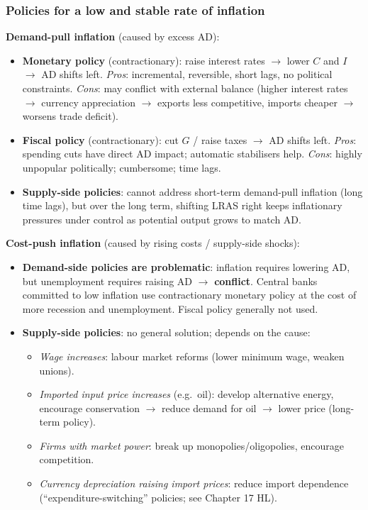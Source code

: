 \documentclass[a4paper,12pt]{article}
\begin{document}
\subsubsection*{Policies for a low and stable rate of inflation}
\textbf{Demand-pull inflation} (caused by excess AD):
\begin{itemize}
  \item \textbf{Monetary policy} (contractionary): raise interest rates $\to$ lower $C$ and $I$ $\to$ AD shifts left. \textit{Pros}: incremental, reversible, short lags, no political constraints. \textit{Cons}: may conflict with external balance (higher interest rates $\to$ currency appreciation $\to$ exports less competitive, imports cheaper $\to$ worsens trade deficit).
  \item \textbf{Fiscal policy} (contractionary): cut $G$ / raise taxes $\to$ AD shifts left. \textit{Pros}: spending cuts have direct AD impact; automatic stabilisers help. \textit{Cons}: highly unpopular politically; cumbersome; time lags.
  \item \textbf{Supply-side policies}: cannot address short-term demand-pull inflation (long time lags), but over the long term, shifting LRAS right keeps inflationary pressures under control as potential output grows to match AD.
\end{itemize}
\textbf{Cost-push inflation} (caused by rising costs / supply-side shocks):
\begin{itemize}
  \item \textbf{Demand-side policies are problematic}: inflation requires lowering AD, but unemployment requires raising AD $\to$ \textbf{conflict}. Central banks committed to low inflation use contractionary monetary policy at the cost of more recession and unemployment. Fiscal policy generally not used.
  \item \textbf{Supply-side policies}: no general solution; depends on the cause:
  \begin{itemize}
    \item \textit{Wage increases}: labour market reforms (lower minimum wage, weaken unions).
    \item \textit{Imported input price increases} (e.g.\ oil): develop alternative energy, encourage conservation $\to$ reduce demand for oil $\to$ lower price (long-term policy).
    \item \textit{Firms with market power}: break up monopolies/oligopolies, encourage competition.
    \item \textit{Currency depreciation raising import prices}: reduce import dependence (``expenditure-switching'' policies; see Chapter 17 HL).
  \end{itemize}
\end{itemize}
\end{document}
